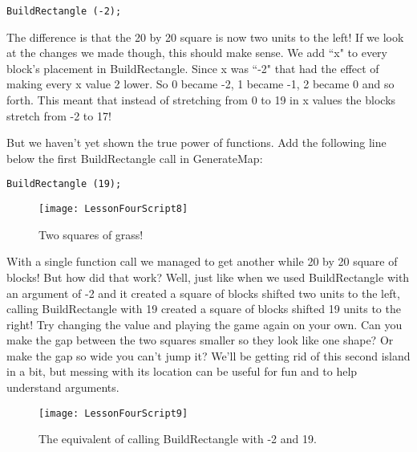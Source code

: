 \documentclass{article}
\begin{document}
\lstset{style=sharpc}
\begin{lstlisting}
BuildRectangle (-2);
\end{lstlisting} 

\noindent{}

The difference is that the 20 by 20 square is now two units to the left! If we look at the changes we made though, this should make sense. We add ``x" to every block's placement in BuildRectangle. Since x was ``-2" that had the effect of making every x value 2 lower. So 0 became -2, 1 became -1, 2 became 0 and so forth. This meant that instead of stretching from 0 to 19 in x values the blocks stretch from -2 to 17!

But we haven't yet shown the true power of functions. Add the following line below the first BuildRectangle call in GenerateMap:

\lstset{style=sharpc}
\begin{lstlisting}
BuildRectangle (19);
\end{lstlisting} 
\begin{figure}
  \texttt{[image: LessonFourScript8]}
  \caption{Two squares of grass!}
  \label{fig:LessonFourScript8}
\end{figure}

\noindent{}

With a single function call we managed to get another while 20 by 20 square of blocks! But how did that work? Well, just like when we used BuildRectangle with an argument of -2 and it created a square of blocks shifted two units to the left, calling BuildRectangle with 19 created a square of blocks shifted 19 units to the right! Try changing the value and playing the game again on your own. Can you make the gap between the two squares smaller so they look like one shape? Or make the gap so wide you can't jump it? We'll be getting rid of this second island in a bit, but messing with its location can be useful for fun and to help understand arguments.

\begin{figure}
  \texttt{[image: LessonFourScript9]}
  \caption{The equivalent of calling BuildRectangle with -2 and 19.}
  \label{fig:LessonFourScript9}
\end{figure}
\end{document}
